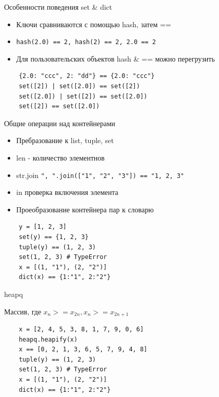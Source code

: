 \documentclass{article}
\begin{document}
\begin{center} Особенности поведения set \& dict \end{center}
\begin{itemize}
	\item Ключи сравниваются с помощью hash, затем ==
	\item \lstinline!hash(2.0) == 2, hash(2) == 2, 2.0 == 2!
	\item Для пользовательских объектов hash \& == можно перегрузить
\end{itemize}
\begin{lstlisting}
	{2.0: "ccc", 2: "dd"} == {2.0: "ccc"}
	set([2]) | set([2.0]) == set([2])
	set([2.0]) | set([2]) == set([2.0])
	set([2]) == set([2.0])
\end{lstlisting}
\newpage

\begin{center} Общие операции над контейнерами \end{center}
\begin{itemize}
	\item Пребразование к list, tuple, set
	\item len - количество элементнов
	\item str.join \lstinline!", ".join(["1", "2", "3"]) == "1, 2, 3"!
	\item in проверка включения элемента
	\item Проеобразование контейнера пар к словарю
\end{itemize}
\begin{lstlisting}
    y = [1, 2, 3]
    set(y) == {1, 2, 3}
    tuple(y) == (1, 2, 3)
    set(1, 2, 3) # TypeError
	x = [(1, "1"), (2, "2")]
	dict(x) == {1:"1", 2:"2"}
\end{lstlisting}
\newpage

\begin{center} heapq \end{center}
Массив, где $x_n >= x_{2n}, x_n >= x_{2n + 1}$
\begin{lstlisting}
    x = [2, 4, 5, 3, 8, 1, 7, 9, 0, 6]
    heapq.heapify(x)
    x == [0, 2, 1, 3, 6, 5, 7, 9, 4, 8]
    tuple(y) == (1, 2, 3)
    set(1, 2, 3) # TypeError
	x = [(1, "1"), (2, "2")]
	dict(x) == {1:"1", 2:"2"}
\end{lstlisting}
\newpage
\end{document}
